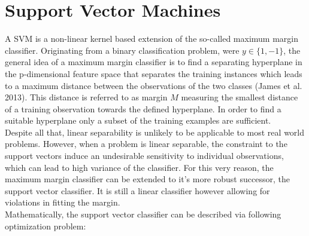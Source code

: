 \section{Support Vector Machines}

A SVM is a non-linear kernel based extension of the so-called maximum margin classifier. Originating from a binary classification problem, were $y \in \{1, -1\}$, the general idea of a maximum margin classifier is to find a separating hyperplane in the p-dimensional feature space that separates the training instances which leads to a maximum distance between the observations of the two classes (James et al. 2013). This distance is referred to as margin $M$ measuring the smallest distance of a training observation towards the defined hyperplane. In order to find a suitable hyperplane only a subset of the training examples are sufficient. \\

Despite all that, linear separability is unlikely to be applicable to most real world problems. However, when a problem is linear separable, the constraint to the support vectors induce an undesirable sensitivity to individual observations, which can lead to high variance of the classifier. For this very reason, the maximum margin classifier can be extended to it's more robust successor, the support vector classifier. It is still a linear classifier however allowing for violations in fitting the margin. \\

Mathematically, the support vector classifier can be described via following optimization problem:

